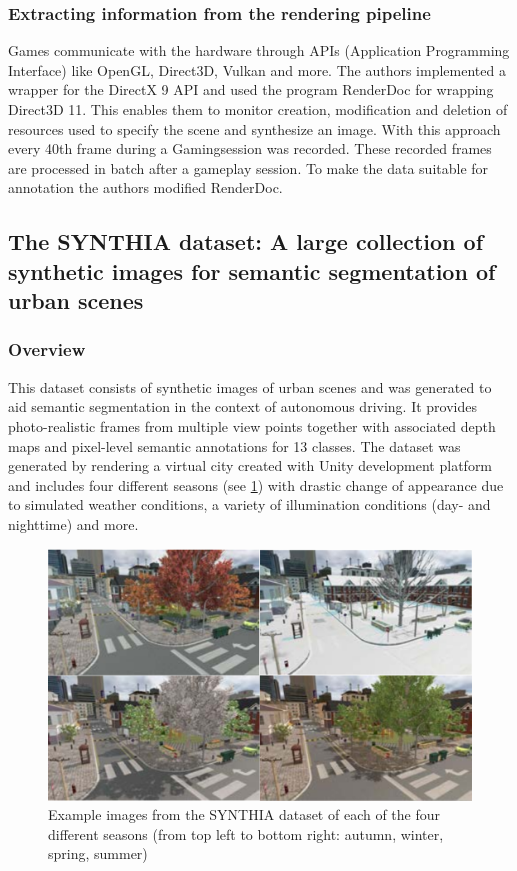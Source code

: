 \documentclass[a4paper,cleardoubleempty,BCOR1cm]{scrbook}
\begin{document}
\subsubsection{Extracting information from the rendering pipeline}
Games communicate with the hardware through APIs (Application Programming Interface) like OpenGL, Direct3D, Vulkan and more. The authors implemented a wrapper for the DirectX 9 API and used the program RenderDoc  for wrapping Direct3D 11. This enables them to monitor creation, modification and deletion of resources used to specify the scene and synthesize an image. With this approach every 40th frame during a Gamingsession was recorded. These recorded frames are processed in batch after a gameplay session. To make the data suitable for annotation the authors modified RenderDoc.


\newpage

\subsection{The SYNTHIA dataset: A large collection of synthetic images for semantic segmentation of urban scenes}
\cite{RosCVPR16}

\subsubsection{Overview}
This dataset consists of synthetic images of urban scenes and was generated to aid semantic segmentation in the context of autonomous driving. It provides photo-realistic frames from multiple view points together with associated depth maps and pixel-level semantic annotations for 13 classes. The dataset was generated by rendering a virtual city created with Unity development platform  and includes four different seasons (see \ref{SYNTHIA_seasons}) with drastic change of appearance due to simulated weather conditions, a variety of illumination conditions (day- and nighttime) and more. 

\begin{figure}[h]
	\centering
	\includegraphics[width=\textwidth]{images/SYNTHIA_seasons.png}
	\caption{Example images from the SYNTHIA dataset of each of the four different seasons (from top left to bottom right: autumn, winter, spring, summer)}
	\label{SYNTHIA_seasons}
\end{figure}
\end{document}
